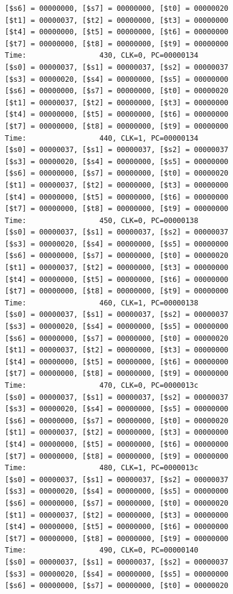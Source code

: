 \documentclass[a4paper,12pt]{article}
\begin{document}
\begin{lstlisting}
[$s6] = 00000000, [$s7] = 00000000, [$t0] = 00000020
[$t1] = 00000037, [$t2] = 00000000, [$t3] = 00000000
[$t4] = 00000000, [$t5] = 00000000, [$t6] = 00000000
[$t7] = 00000000, [$t8] = 00000000, [$t9] = 00000000
Time:                 430, CLK=0, PC=00000134
[$s0] = 00000037, [$s1] = 00000037, [$s2] = 00000037
[$s3] = 00000020, [$s4] = 00000000, [$s5] = 00000000
[$s6] = 00000000, [$s7] = 00000000, [$t0] = 00000020
[$t1] = 00000037, [$t2] = 00000000, [$t3] = 00000000
[$t4] = 00000000, [$t5] = 00000000, [$t6] = 00000000
[$t7] = 00000000, [$t8] = 00000000, [$t9] = 00000000
Time:                 440, CLK=1, PC=00000134
[$s0] = 00000037, [$s1] = 00000037, [$s2] = 00000037
[$s3] = 00000020, [$s4] = 00000000, [$s5] = 00000000
[$s6] = 00000000, [$s7] = 00000000, [$t0] = 00000020
[$t1] = 00000037, [$t2] = 00000000, [$t3] = 00000000
[$t4] = 00000000, [$t5] = 00000000, [$t6] = 00000000
[$t7] = 00000000, [$t8] = 00000000, [$t9] = 00000000
Time:                 450, CLK=0, PC=00000138
[$s0] = 00000037, [$s1] = 00000037, [$s2] = 00000037
[$s3] = 00000020, [$s4] = 00000000, [$s5] = 00000000
[$s6] = 00000000, [$s7] = 00000000, [$t0] = 00000020
[$t1] = 00000037, [$t2] = 00000000, [$t3] = 00000000
[$t4] = 00000000, [$t5] = 00000000, [$t6] = 00000000
[$t7] = 00000000, [$t8] = 00000000, [$t9] = 00000000
Time:                 460, CLK=1, PC=00000138
[$s0] = 00000037, [$s1] = 00000037, [$s2] = 00000037
[$s3] = 00000020, [$s4] = 00000000, [$s5] = 00000000
[$s6] = 00000000, [$s7] = 00000000, [$t0] = 00000020
[$t1] = 00000037, [$t2] = 00000000, [$t3] = 00000000
[$t4] = 00000000, [$t5] = 00000000, [$t6] = 00000000
[$t7] = 00000000, [$t8] = 00000000, [$t9] = 00000000
Time:                 470, CLK=0, PC=0000013c
[$s0] = 00000037, [$s1] = 00000037, [$s2] = 00000037
[$s3] = 00000020, [$s4] = 00000000, [$s5] = 00000000
[$s6] = 00000000, [$s7] = 00000000, [$t0] = 00000020
[$t1] = 00000037, [$t2] = 00000000, [$t3] = 00000000
[$t4] = 00000000, [$t5] = 00000000, [$t6] = 00000000
[$t7] = 00000000, [$t8] = 00000000, [$t9] = 00000000
Time:                 480, CLK=1, PC=0000013c
[$s0] = 00000037, [$s1] = 00000037, [$s2] = 00000037
[$s3] = 00000020, [$s4] = 00000000, [$s5] = 00000000
[$s6] = 00000000, [$s7] = 00000000, [$t0] = 00000020
[$t1] = 00000037, [$t2] = 00000000, [$t3] = 00000000
[$t4] = 00000000, [$t5] = 00000000, [$t6] = 00000000
[$t7] = 00000000, [$t8] = 00000000, [$t9] = 00000000
Time:                 490, CLK=0, PC=00000140
[$s0] = 00000037, [$s1] = 00000037, [$s2] = 00000037
[$s3] = 00000020, [$s4] = 00000000, [$s5] = 00000000
[$s6] = 00000000, [$s7] = 00000000, [$t0] = 00000020

\end{lstlisting}
\end{document}
